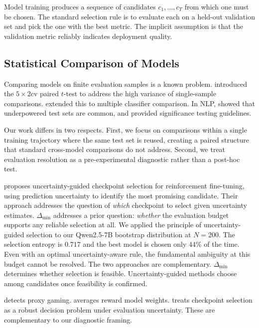 \documentclass[pdflatex,sn-mathphys-ay,iicol]{sn-jnl}
\theoremstyle{thmstylethree}
\begin{document}
Model training produces a sequence of candidates $c_1,\dots,c_T$ from which one must be chosen. The standard selection rule is to evaluate each on a held-out validation set and pick the one with the best metric. The implicit assumption is that the validation metric reliably indicates deployment quality.

\subsection{Statistical Comparison of Models}

Comparing models on finite evaluation samples is a known problem. \citet{dietterich1998approximate} introduced the $5\times2$cv paired $t$-test to address the high variance of single-sample comparisons. \citet{demsar2006statistical} extended this to multiple classifier comparison. In NLP, \citet{card2020power} showed that underpowered test sets are common, and \citet{dror2018hitchhiker} provided significance testing guidelines.

Our work differs in two respects. First, we focus on comparisons within a single training trajectory where the same test set is reused, creating a paired structure that standard cross-model comparisons do not address. Second, we treat evaluation resolution as a pre-experimental diagnostic rather than a post-hoc test.

\citet{nguyen2025ugcs} proposes uncertainty-guided checkpoint selection for reinforcement fine-tuning, using prediction uncertainty to identify the most promising candidate. Their approach addresses the question of \emph{which} checkpoint to select given uncertainty estimates. $\Delta_{\min}$ addresses a prior question: \emph{whether} the evaluation budget supports any reliable selection at all. We applied the principle of uncertainty-guided selection to our Qwen2.5-7B bootstrap distribution at $N=200$. The selection entropy is $0.717$ and the best model is chosen only $44\%$ of the time. Even with an optimal uncertainty-aware rule, the fundamental ambiguity at this budget cannot be resolved. The two approaches are complementary. $\Delta_{\min}$ determines whether selection is feasible. Uncertainty-guided methods choose among candidates once feasibility is confirmed.

\citet{shihab2025est} detects proxy gaming. \citet{rame2024warm} averages reward model weights. \citet{xu2026a} treats checkpoint selection as a robust decision problem under evaluation uncertainty. These are complementary to our diagnostic framing.
\end{document}
